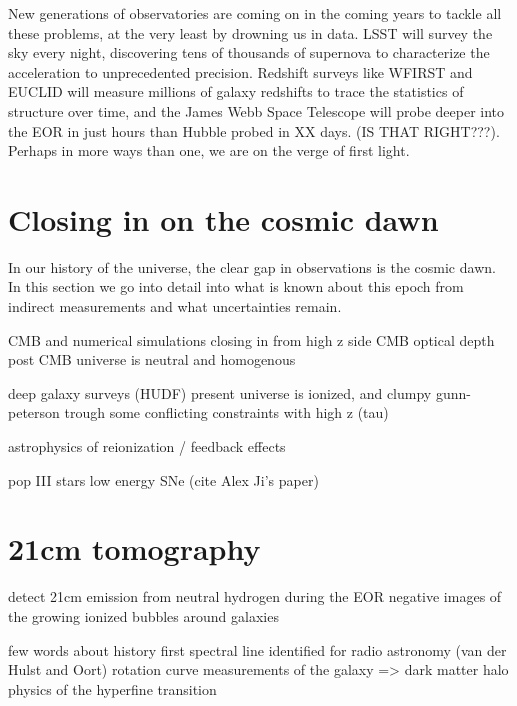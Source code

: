 New generations of observatories are coming on in the coming years to tackle all these problems, at the very least by drowning us in data. LSST will survey the sky every night, discovering tens of thousands of supernova to characterize the acceleration to unprecedented precision. Redshift surveys like WFIRST and EUCLID will measure millions of galaxy redshifts to trace the statistics of structure over time, and the James Webb Space Telescope will probe deeper into the EOR in just hours than Hubble probed in XX days. (IS THAT RIGHT???). Perhaps in more ways than one, we are on the verge of first light.

\section{Closing in on the cosmic dawn}

In our history of the universe, the clear gap in observations is the cosmic dawn. In this section we go into detail into what is known about this epoch from indirect measurements and what uncertainties remain.

CMB and numerical simulations closing in from high z side
CMB optical depth
post CMB universe is neutral and homogenous

deep galaxy surveys (HUDF)
present universe is ionized, and clumpy
gunn-peterson trough
some conflicting constraints with high z (tau)

astrophysics of reionization / feedback effects 

pop III stars
low energy SNe (cite Alex Ji's paper)


\section{21cm tomography}

detect 21cm emission from neutral hydrogen during the EOR
negative images of the growing ionized bubbles around galaxies

few words about history
	first spectral line identified for radio astronomy (van der Hulst and Oort)
	rotation curve measurements of the galaxy => dark matter halo
physics of the hyperfine transition \citep{griffithshyperfine}

